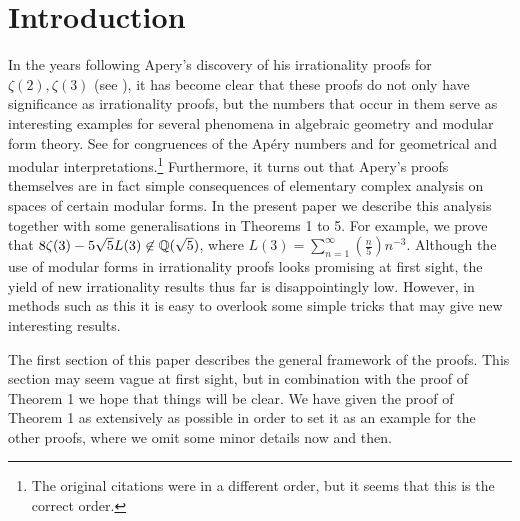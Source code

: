 \section{Introduction}

In the years following Apery's discovery of his irrationality proofs for $\zeta(2), \zeta(3)$ (see \cite{van1979proof}), it has become clear that these proofs do not only have significance as irrationality proofs, but the numbers that occur in them serve as interesting examples for several phenomena in algebraic geometry and modular form theory.
See \cite{gessel1982some,beukers1982irrationality,beukers1985some} for congruences of the Ap\'ery numbers and \cite{beukers1984family,stienstra1985picard} for geometrical and modular interpretations.\footnote{The original citations were in a different order, but it seems that this is the correct order.}
Furthermore, it turns out that Apery's proofs themselves are in fact simple consequences of elementary complex analysis on spaces of certain modular forms.
In the present paper we describe this analysis together with some generalisations in Theorems 1 to 5. 
For example, we prove that $8\zeta(3) - 5 \sqrt{5} L(3) \not \in \mathbb{Q}(\sqrt{5})$, where $L(3) = \sum_{n=1}^{\infty} \left(\frac{n}{5}\right) n^{-3}$.
Although the use of modular forms in irrationality proofs looks promising at first sight, the yield of new irrationality results thus far is disappointingly low. 
However, in methods such as this it is easy to overlook some simple tricks that may give new interesting results.

The first section of this paper describes the general framework of the proofs.
This section may seem vague at first sight, but in combination with the proof of Theorem 1 we hope that things will be clear.
We have given the proof of Theorem 1 as extensively as possible in order to set it as an example for the other proofs, where we omit some minor details now and then. 